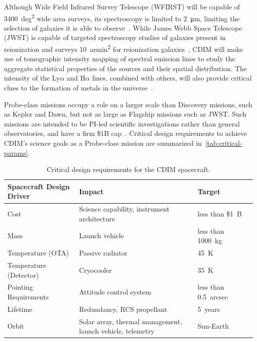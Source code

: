 \documentclass{ws-jai}
\begin{document}
Although Wide Field Infrared Survey Telescope (WFIRST) will be capable of \SI{3400}{deg\squared} wide area surveys, its spectroscopy is limited to \SI{2}{\micro\meter}, limiting the selection of galaxies it is able to observe~\cite{wfirstFinal2012}.
While James Webb Space Telescope (JWST) is capable of targeted spectroscopy studies of galaxies present in reionization and surveys \SI{10}{armin\squared} for reionization galaxies~\cite{Gardner2006}, CDIM will make use of tomographic intensity mapping of spectral emission lines to study the aggregate statistical properties of the sources and their spatial distribution.
The intensity of the Ly$\alpha$ and H$\alpha$ lines, combined with others, will also provide critical clues to the formation of metals in the universe~\cite{cooray2016cdim2page}.

Probe-class missions occupy a role on a larger scale than Discovery missions, such as Kepler and Dawn, but not as large as Flagship missions such as JWST.\@
Such missions are intended to be PI-led scientific investigations rather than general observatories, and have a firm \$1B cap~\cite{probeclasswp}.
Critical design requirements to achieve CDIM's science goals as a Probe-class mission are summarized in~\autoref{tab:critical-params}.



\begin{table}
  \caption{Critical design requirements for the CDIM spacecraft.}
  \small\centering
  \begin{tabular}{@{}llll@{}} \toprule
    Spacecraft Design Driver & Impact & Target \\ \midrule
    Cost & Science capability, instrument architecture & less than \$\SI{1}{B} \\
    Mass & Launch vehicle & less than \SI{1000}{\kilo\gram} \\
    Temperature (OTA) & Passive radiator & \SI{45}{\kelvin} \\
    Temperature (Detector) & Cryocooler & \SI{35}{\kelvin} \\
    Pointing Requirements & Attitude control system & less than \SI{0.5}{arcsec} \\
    Lifetime & Redundancy, RCS propellant & \SI{5}{years} \\
    Orbit & Solar array, thermal management, launch vehicle, telemetry & Sun-Earth \Ltwo{} \\
    \bottomrule
  \end{tabular}
\label{tab:critical-params}
\end{table}
\end{document}
